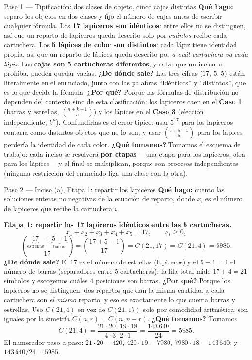 \documentclass[11pt]{article}
\begin{document}
\begin{sol}

\begin{paso}{Paso 1 --- Tipificación: dos clases de objeto, cinco cajas distintas}
\textbf{Qué hago:} separo los objetos en dos clases y fijo el número de cajas antes de escribir cualquier fórmula. Los \textbf{17 lapiceros son idénticos}: entre ellos no se distinguen, así que un reparto de lapiceros queda descrito solo por \emph{cuántos} recibe cada cartuchera. Los \textbf{5 lápices de color son distintos}: cada lápiz tiene identidad propia, así que un reparto de lápices queda descrito por \emph{a cuál cartuchera va cada lápiz}. Las \textbf{cajas son 5 cartucheras diferentes}, y salvo que un inciso lo prohíba, pueden quedar vacías.
\textbf{¿De dónde sale?} Las tres cifras ($17$, $5$, $5$) están literalmente en el enunciado, junto con las palabras ``idénticos'' y ``distintos'', que es lo que decide la fórmula.
\textbf{¿Por qué?} Porque las fórmulas de distribución no dependen del contexto sino de esta clasificación: los lapiceros caen en el \textbf{Caso 1} (barras y estrellas, $\binom{n+k-1}{n}$) y los lápices en el \textbf{Caso 3} (elección independiente, $k^n$). Confundirlas es el error típico: usar $5^{17}$ para los lapiceros contaría como distintos objetos que no lo son, y usar $\binom{5+5-1}{5}$ para los lápices perdería la identidad de cada color.
\textbf{¿Qué tomamos?} Tomamos el esquema de trabajo: cada inciso se resolverá \textbf{por etapas} —una etapa para los lapiceros, otra para los lápices— y al final se multiplican, porque son procesos independientes (ninguna restricción del enunciado liga una clase con la otra).
\end{paso}

\begin{paso}{Paso 2 --- Inciso (a), Etapa 1: repartir los lapiceros}
\textbf{Qué hago:} cuento las soluciones enteras no negativas de la ecuación de reparto, donde $x_i$ es el número de lapiceros que recibe la cartuchera $i$.

\medskip
\textbf{Etapa 1: repartir los 17 lapiceros idénticos entre las 5 cartucheras.}
\[
x_1+x_2+x_3+x_4+x_5=17,\qquad x_i\ge 0 ,
\]
\[
\binom{\underbrace{17}_{\text{estrellas}}+\underbrace{5-1}_{\text{barras}}}{17}=\binom{17+5-1}{17}=C(21,17)=C(21,4)=5985 .
\]
\textbf{¿De dónde sale?} El $17$ es el número de estrellas (lapiceros) y el $5-1=4$ el número de barras (separadores entre 5 cartucheras); la fila total mide $17+4=21$ símbolos y escogemos cuáles $4$ posiciones son barras.
\textbf{¿Por qué?} Porque los lapiceros no se distinguen: dos repartos que dan la misma cantidad a cada cartuchera son \emph{el mismo} reparto, y eso es exactamente lo que cuenta barras y estrellas. Uso $C(21,4)$ en vez de $C(21,17)$ solo por comodidad aritmética; son iguales por la simetría $C(n,r)=C(n,n-r)$.
\textbf{¿Qué tomamos?} Tomamos
\[
C(21,4)=\frac{21\cdot 20\cdot 19\cdot 18}{4\cdot 3\cdot 2\cdot 1}=\frac{143\,640}{24}=5985 .
\]
El numerador paso a paso: $21\cdot 20=420$, $420\cdot 19=7980$, $7980\cdot 18=143\,640$; y $143\,640/24=5985$.
\end{paso}


\end{sol}
\end{document}
